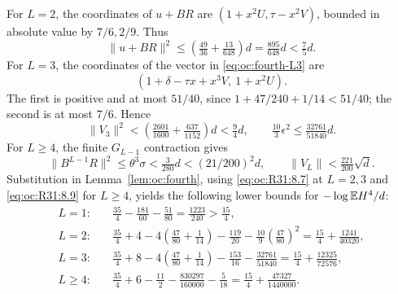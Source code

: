 For \(L=2\), the coordinates of \(u+BR\) are
\((1+x^2U,\tau-x^2V)\), bounded in absolute value by \(7/6,2/9\).
Thus
\begin{equation}\tag{R31.8.11}\label{eq:oc:R31:8.11}
 \|u+BR\|^2\le\left(\tfrac{49}{36}+\tfrac{13}{648}\right)d
 =\tfrac{895}{648}d<\tfrac75d.
\end{equation}
For \(L=3\), the coordinates of the vector in
\eqref{eq:oc:fourth-L3} are
\begin{equation}\tag{R31.8.13}\label{eq:oc:R31:8.13}
 (1+\delta-\tau x+x^3V,\ 1+x^2U).
\end{equation}
The first is positive and at most \(51/40\), since
\(1+47/240+1/14<51/40\); the second is at most \(7/6\). Hence
\[
 \|V_3\|^2<\left(\tfrac{2601}{1600}+\tfrac{637}{1152}\right)d
 <\tfrac94d,\qquad
 \tfrac{10}{3}\epsilon^2\le\tfrac{32761}{51840}d.
\]
For \(L\ge4\), the finite \(G_{L-1}\) contraction gives
\[
 \|B^{L-1}R\|^2\le\theta^3\sigma<\tfrac3{280}d
 <(21/200)^2d,\qquad \|V_L\|<\tfrac{221}{200}\sqrt d.
\]
Substitution in Lemma~\ref{lem:oc:fourth}, using
\eqref{eq:oc:R31:8.7} at \(L=2,3\) and
\eqref{eq:oc:R31:8.9} for \(L\ge4\), yields the following
lower bounds for \(-\log\mathbb E H^4/d\):
\begin{align}
 L=1:\quad&\tfrac{35}{4}-\tfrac{181}{60}-\tfrac{51}{80}
       =\tfrac{1223}{240}>\tfrac{15}{4},
       \tag{R31.8.10}\label{eq:oc:R31:8.10}\\
 L=2:\quad&\tfrac{35}{4}+4-4(\tfrac{47}{80}+\tfrac1{14})
       -\tfrac{119}{20}-\tfrac{10}{9}(\tfrac{47}{80})^2
       =\tfrac{15}{4}+\tfrac{1241}{40320},
       \tag{R31.8.12}\label{eq:oc:R31:8.12}\\
 L=3:\quad&\tfrac{35}{4}+8-4(\tfrac{47}{80}+\tfrac1{14})
       -\tfrac{153}{16}-\tfrac{32761}{51840}
       =\tfrac{15}{4}+\tfrac{12325}{72576},
       \tag{R31.8.14}\label{eq:oc:R31:8.14}\\
 L\ge4:\quad&\tfrac{35}{4}+6-\tfrac{11}{2}
       -\tfrac{830297}{160000}-\tfrac5{18}
       =\tfrac{15}{4}+\tfrac{47327}{1440000}.
       \tag{R31.8.15}\label{eq:oc:R31:8.15}
\end{align}


